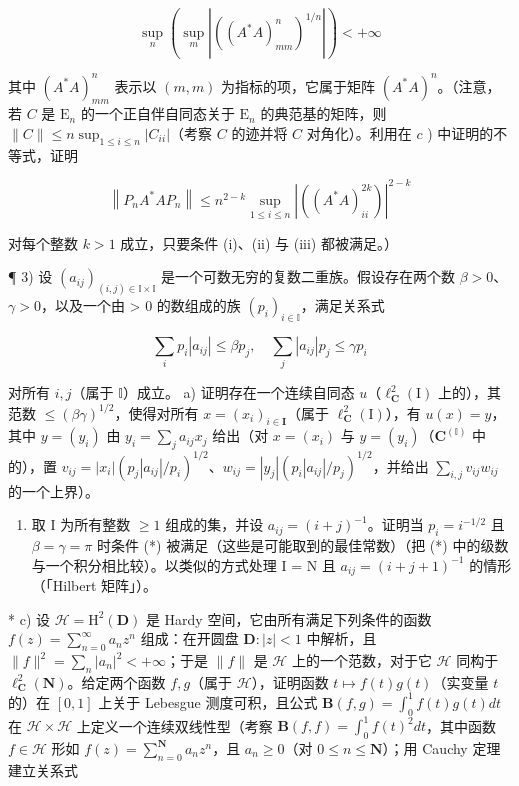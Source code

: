\begin{enumerate}
\[
\sup _ {n} \left(\sup _ {m} | ((A ^ {*} A) _ {m m} ^ {n}) ^ {1 / n} |\right) <   + \infty
\]

其中 \((A^{*}A)_{mm}^{n}\) 表示以 \((m,m)\) 为指标的项，它属于矩阵 \((A^{*}A)^{n}\)。（注意，若 \(C\) 是 \(\mathrm{E}_n\) 的一个正自伴自同态关于 \(\mathrm{E}_n\) 的典范基的矩阵，则 \(\| C\| \leqslant n\sup_{1\leqslant i\leqslant n}|C_{ii}|\)（考察 \(C\) 的迹并将 \(C\) 对角化）。利用在 \(c\) ) 中证明的不等式，证明

\[
\left\| P _ {n} A ^ {*} A P _ {n} \right\| \leqslant n ^ {2 - k} \sup _ {1 \leqslant i \leqslant n} \left| ((A ^ {*} A) _ {i i} ^ {2 k}) \right| ^ {2 - k}
\]

对每个整数 \(k > 1\) 成立，只要条件 (i)、(ii) 与 (iii) 都被满足。）

¶ 3) 设 \((a_{ij})_{(i,j)\in\mathbb{I}\times\mathbb{I}}\) 是一个可数无穷的复数二重族。假设存在两个数 \(\beta > 0\)、\(\gamma > 0\)，以及一个由 > 0 的数组成的族 \((p_i)_{i\in\mathbb{I}}\)，满足关系式

\[
\sum_ {i} p _ {i} | a _ {i j} | \leqslant \beta p _ {j}, \quad \sum_ {j} | a _ {i j} | p _ {j} \leqslant \gamma p _ {i}\tag{*}
\]

对所有 \(i, j\)（属于 \(\mathbb{I}\)）成立。
a) 证明存在一个连续自同态 \(u\)（\(\ell_{\mathbf{C}}^2 (\mathrm{I})\) 上的），其范数 \(\leqslant (\beta \gamma)^{1 / 2}\)，使得对所有 \(x = (x_{i})_{i\in \mathbf{I}}\)（属于 \(\ell_{\mathbf{C}}^2 (\mathrm{I})\)），有 \(u(x) = y\)，其中 \(y = (y_{i})\) 由 \(y_{i} = \sum_{j}a_{ij}x_{j}\) 给出（对 \(x = (x_{i})\) 与 \(y = (y_{i})\)（\(\mathbf{C}^{(\mathbb{I})}\) 中的），置 \(v_{ij} = |x_i| (p_j|a_{ij}| / p_i)^{1 / 2}\)、\(w_{ij} = |y_j|(p_i|a_{ij}| / p_j)^{1 / 2}\)，并给出 \(\sum_{i,j}v_{ij}w_{ij}\) 的一个上界）。

\begin{enumerate}
\def\labelenumi{\alph{enumi})}
\setcounter{enumi}{1}
\tightlist
\item
  取 I 为所有整数 \(\geqslant 1\) 组成的集，并设 \(a_{ij} = (i + j)^{-1}\)。证明当 \(p_i = i^{-1/2}\) 且 \(\beta = \gamma = \pi\) 时条件 (*) 被满足（这些是可能取到的最佳常数）（把 (*) 中的级数与一个积分相比较）。以类似的方式处理 I = N 且 \(a_{ij} = (i + j + 1)^{-1}\) 的情形（「Hilbert 矩阵」）。
\end{enumerate}

* c) 设 \(\mathcal{H} = \mathrm{H}^2 (\mathbf{D})\) 是 Hardy 空间，它由所有满足下列条件的函数 \(f(z) = \sum_{n=0}^{\infty} a_n z^n\) 组成：在开圆盘 \(\mathbf{D}:|z| < 1\) 中解析，且 \(\| f\|^2 = \sum_n |a_n|^2 < +\infty\)；于是 \(\| f\|\) 是 \(\mathcal{H}\) 上的一个范数，对于它 \(\mathcal{H}\) 同构于 \(\ell_{\mathbf{C}}^2 (\mathbf{N})\)。给定两个函数 \(f, g\)（属于 \(\mathcal{H}\)），证明函数 \(t \mapsto f(t) g(t)\)（实变量 \(t\) 的）在 \([0,1]\) 上关于 Lebesgue 测度可积，且公式 \(\mathbf{B}(f,g) = \int_0^1 f(t) g(t) dt\) 在 \(\mathcal{H} \times \mathcal{H}\) 上定义一个连续双线性型（考察 \(\mathbf{B}(f,f) = \int_0^1 f(t)^2 dt\)，其中函数 \(f \in \mathcal{H}\) 形如 \(f(z) = \sum_{n=0}^{\mathbf{N}} a_n z^n\)，且 \(a_n \geqslant 0\)（对 \(0 \leqslant n \leqslant \mathbf{N}\)）；用 Cauchy 定理建立关系式


\end{enumerate}
